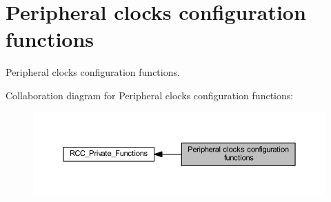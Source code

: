 \hypertarget{group___r_c_c___group3}{}\section{Peripheral clocks configuration functions}
\label{group___r_c_c___group3}


Peripheral clocks configuration functions.  


Collaboration diagram for Peripheral clocks configuration functions\+:
\nopagebreak
\begin{figure}[H]
\begin{center}
\leavevmode
\includegraphics[width=350pt]{group___r_c_c___group3}
\end{center}
\end{figure}
